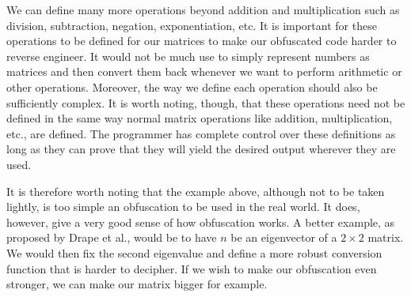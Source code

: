 We can define many more operations beyond addition and multiplication such as
division, subtraction, negation, exponentiation, etc. It is important for
these operations to be defined for our matrices to make our obfuscated code
harder to reverse engineer. It would not be much use to simply represent
numbers as
matrices and then convert them back whenever we want to perform arithmetic or
other operations. Moreover, the way we define each operation should also be
sufficiently complex. It is worth noting, though, that these operations need
not be defined in the same way normal matrix operations like addition,
multiplication, etc., are defined. The programmer has complete control over
these definitions as long as they can prove that they will yield the desired
output wherever they are used.

It is therefore worth noting that the example above, although not to be taken
lightly, is too simple an
obfuscation to be used in the real world. It does, however, give a very good
sense of how
obfuscation works. A better example, as proposed by Drape et al., would be to
have $ n $ be an eigenvector of a $ 2 \times 2 $ matrix. We would then fix the
second eigenvalue and define a more robust conversion function that is harder
to decipher. If we wish to make our obfuscation even stronger, we can make our
matrix bigger for example.



